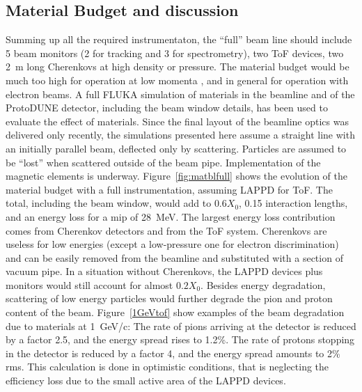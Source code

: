
\subsection{Material Budget and discussion}
Summing up all the required instrumentaton, the ``full'' beam line should include
 5 beam monitors (2 for tracking and 3 for spectrometry), two ToF devices, two 2~m long Cherenkovs at high density or pressure. The material budget would be much too high for operation at low momenta
 , and in general for operation with electron beams.  
A full FLUKA  simulation of materials in the beamline and of the ProtoDUNE detector, including the beam window details, has been used to evaluate the effect of materials. 
Since the final layout of the beamline optics was delivered only recently, the simulations presented here assume a straight line with an initially parallel beam, deflected only by scattering. Particles are assumed to be ``lost'' when scattered outside of the beam pipe. Implementation of the magnetic elements is underway.
 Figure~\ref{fig:matblfull} shows the evolution of the material budget with a full instrumentation, assuming LAPPD for ToF. The total, including the beam window, would add to $0.6X_0$, 0.15 interaction lengths, and an energy loss for a mip of 28~MeV.
The largest energy loss contribution comes from Cherenkov detectors and from the  ToF system. Cherenkovs are useless for low energies (except a low-pressure one for electron discrimination) and can be easily removed from the beamline and substituted with a section of vacuum pipe.  
In a situation without Cherenkovs, the LAPPD devices plus monitors would still account for almost  $0.2X_0$. Besides energy degradation, scattering of low energy particles would  further degrade the pion and proton content of the beam.  Figure~\ref{1GeVtof} show examples of the beam degradation due to materials at 1~GeV/c: The rate of pions arriving at the detector is reduced by a factor 2.5, and the energy spread rises to 1.2\%. The rate of protons stopping in the detector is reduced by a factor 4, and the energy spread amounts to 2\% rms. This calculation is done in optimistic conditions, that is neglecting the efficiency loss due to the small active area of the LAPPD devices.

